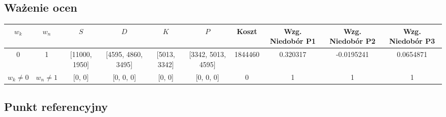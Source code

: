 \documentclass[a4paper, 10pt]{article}
\begin{document}
\begin{landscape}
\subsection{Ważenie ocen}


\begin{center}
    \begin{tabular}{ | c | c | c | c | c | c | c | c | c | c |}
    \hline
    $w_k$ & $w_n$ & $S$ & $D$ & $K$ & $P$ & Koszt & Wzg. Niedobór P1  & Wzg. Niedobór P2 & Wzg. Niedobór P3 \\ \hline
	0 & 1 &  [11000, 1950] &  [4595, 4860, 3495] &  [5013, 3342] &  [3342, 5013, 4595] & 1844460 & 0.320317 & -0.0195241 & 0.0654871\\ \hline
	$w_k \ne 0$ & $w_n \ne 1$ &  [0, 0] &  [0, 0, 0] &  [0, 0] &  [0, 0, 0] & 0 & 1 & 1 & 1 \\ \hline
    \end{tabular}
\end{center}






\subsection{Punkt referencyjny}



\begin{center}
    \begin{tabular}{ | l | c | c | c | c | c | c | c | c |c |}
    \hline
	

\end{tabular}
\end{center}
\end{landscape}
\end{document}
